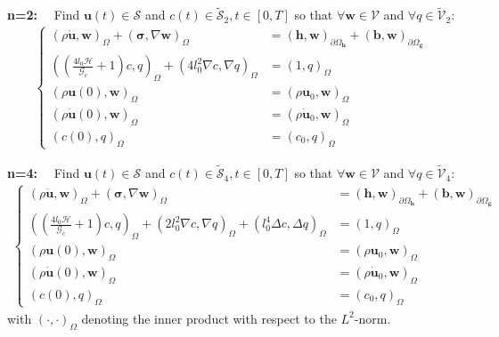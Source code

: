 \textbf{n=2:}$\quad$ Find $\mathbf{u}\left(t\right)\in\bm{\mathcal{S}}$ and $c\left(t\right)\in\tilde{\mathcal{S}}_{2},t\in\left[0,T\right]$ so that $\forall \mathbf{w}\in\bm{\mathcal{V}}$ and $\forall q\in\tilde{\mathcal{V}}_{2}$:
\begin{equation} \label{eq:weak_2}
\begin{aligned}
\left\{\begin{alignedat}{2}
	\left(\rho \ddot{\mathbf{u}},\mathbf{w}\right)_{\Omega} + \left(\bm{\sigma},\nabla\mathbf{w}\right)_{\Omega} &= \left(\mathbf{h},\mathbf{w}\right)_{\partial\Omega_{\mathbf{h}}} + \left(\mathbf{b},\mathbf{w}\right)_{\partial\Omega_{\mathbf{g}}} \\
	\left(\left(\frac{4l_{0}\mathcal{H}}{\mathcal{G}_{c}}+1\right)c,q\right)_{\Omega} + \left(4l_{0}^{2}\nabla c,\nabla q\right)_{\Omega} &= \left(1,q\right)_{\Omega} \\
	\left(\rho\mathbf{u}\left(0\right),\mathbf{w}\right)_{\Omega} &= \left(\rho\mathbf{u}_{0},\mathbf{w}\right)_{\Omega} \\
	\left(\rho\dot{\mathbf{u}}\left(0\right),\mathbf{w}\right)_{\Omega} &= \left(\rho\dot{\mathbf{u}}_{0},\mathbf{w}\right)_{\Omega} \\
	\left(c\left(0\right),q\right)_{\Omega} &= \left(c_{0},q\right)_{\Omega}
\end{alignedat}\right.
\end{aligned}
\end{equation}

\textbf{n=4:}$\quad$ Find $\mathbf{u}\left(t\right)\in\bm{\mathcal{S}}$ and $c\left(t\right)\in\tilde{\mathcal{S}}_{4},t\in\left[0,T\right]$ so that $\forall \mathbf{w}\in\bm{\mathcal{V}}$ and $\forall q\in\tilde{\mathcal{V}}_{4}$:
\begin{equation} \label{eq:weak_4}
\begin{aligned}
\left\{\begin{alignedat}{2}
	\left(\rho \ddot{\mathbf{u}},\mathbf{w}\right)_{\Omega} + \left(\bm{\sigma},\nabla\mathbf{w}\right)_{\Omega} &= \left(\mathbf{h},\mathbf{w}\right)_{\partial\Omega_{\mathbf{h}}} + \left(\mathbf{b},\mathbf{w}\right)_{\partial\Omega_{\mathbf{g}}} \\
	\left(\left(\frac{4l_{0}\mathcal{H}}{\mathcal{G}_{c}}+1\right)c,q\right)_{\Omega} + \left(2l_{0}^{2}\nabla c,\nabla q\right)_{\Omega} + \left(l_{0}^{4}\Delta c,\Delta q\right)_{\Omega}&= \left(1,q\right)_{\Omega} \\
	\left(\rho\mathbf{u}\left(0\right),\mathbf{w}\right)_{\Omega} &= \left(\rho\mathbf{u}_{0},\mathbf{w}\right)_{\Omega} \\
	\left(\rho\dot{\mathbf{u}}\left(0\right),\mathbf{w}\right)_{\Omega} &= \left(\rho\dot{\mathbf{u}}_{0},\mathbf{w}\right)_{\Omega} \\
	\left(c\left(0\right),q\right)_{\Omega} &= \left(c_{0},q\right)_{\Omega}
\end{alignedat}\right.
\end{aligned}
\end{equation}
with $\left(\cdot,\cdot\right)_{\Omega}$ denoting the inner product with respect to the $L^{2}$-norm.

